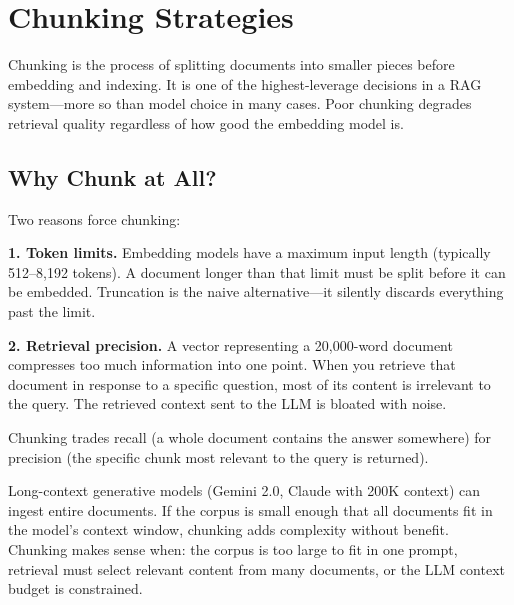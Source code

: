 \chapter{Chunking Strategies}
\label{ch:chunking}

Chunking is the process of splitting documents into smaller pieces before embedding and
indexing. It is one of the highest-leverage decisions in a RAG system---more so than model
choice in many cases. Poor chunking degrades retrieval quality regardless of how good the
embedding model is.

\section{Why Chunk at All?}

Two reasons force chunking:

\textbf{1. Token limits.} Embedding models have a maximum input length (typically 512--8{,}192
tokens). A document longer than that limit must be split before it can be embedded. Truncation
is the naive alternative---it silently discards everything past the limit.

\textbf{2. Retrieval precision.} A vector representing a 20{,}000-word document compresses too
much information into one point. When you retrieve that document in response to a specific
question, most of its content is irrelevant to the query. The retrieved context sent to the LLM
is bloated with noise.

Chunking trades recall (a whole document contains the answer somewhere) for precision (the
specific chunk most relevant to the query is returned).

\begin{tipbox}
Long-context generative models (Gemini 2.0, Claude with 200K context) can ingest entire
documents. If the corpus is small enough that all documents fit in the model's context window,
chunking adds complexity without benefit. Chunking makes sense when: the corpus is too large
to fit in one prompt, retrieval must select relevant content from many documents, or the LLM
context budget is constrained.
\end{tipbox}

